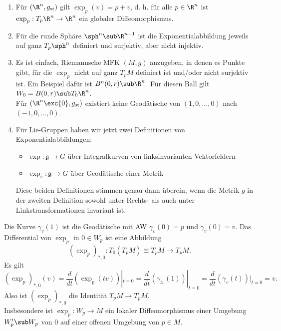 \begin{beispiele}
\begin{enumerate}
\item Für $(\R^n, g_\text{st})$ gilt $\exp_p (v) = p+v$, d. h. für alle $p \in \R^n$ ist $\exp_p: T_p\R^n \to \R^n$ ein globaler Diffeomorphismus.
\item Für die runde Sphäre $\sph^n \sub \R^{n+1}$ ist die Exponentialabbildung jeweils auf ganz $T_p \sph^n$ definiert und surjektiv, aber nicht injektiv.
\item Es ist einfach, Riemannsche MFK $(M,g)$ anzugeben, in denen es Punkte gibt, für die $\exp_p$ nicht auf ganz $T_pM$ definiert ist und/oder nicht surjektiv ist. Ein Beispiel dafür ist $B^n(0,r) \sub \R^n$. Für diesen Ball gilt $W_0 = B(0,r) \sub T_0 \R^n$.\\
Für $(\R^n \exc \{0\}, g_\text{st})$ existiert keine Geodätische von $(1,0, \dots, 0)$ nach $(-1, 0, \dots, 0 )$.
\item Für Lie-Gruppen haben wir jetzt zwei Definitionen von Exponentialabbildungen:
\begin{itemize}
\item $\exp: \mathfrak{g} \to G$ über Integralkurven von linksinvarianten Vektorfeldern
\item $\exp_e: \mathfrak{g} \to G$ über Geodätische einer Metrik
\end{itemize}
Diese beiden Definitionen stimmen genau dann überein, wenn die Metrik $g$ in der zweiten Definition sowohl unter Rechts- als auch unter Linkstransformationen invariant ist.
\end{enumerate}
\end{beispiele}
\begin{bemerkung}
Die Kurve $\gamma_v(1)$ ist die Geodätische mit AW $\gamma_v(0)=p$ und $\dot{\gamma}_v(0)=v$. Das Differential von $\exp_p$ in $0 \in W_p$ ist eine Abbildung
\begin{equation}
(\exp_p)_{\ast,0}: T_0(T_pM) \cong T_pM \to T_pM.
\end{equation}
Es gilt
\begin{equation}
(\exp_p)_{\ast,0} (v) = \frac{d}{dt} (\exp_p(tv))|_{t=0} = \frac{d}{dt} (\gamma_{tv}(1))|_{t=0} = \frac{d}{dt}(\gamma_v (t))|_{t=0} = v.
\end{equation}
Also ist $(\exp_p)_{\ast,0}$ die Identität $T_pM \to T_pM$.\\
Insbesondere ist $\exp_p: W_p \to M$ ein lokaler Diffeomorphismus einer Umgebung $W_p' \sub W_p$ von $0$ auf einer offenen Umgebung von $p \in M$.
\end{bemerkung}
